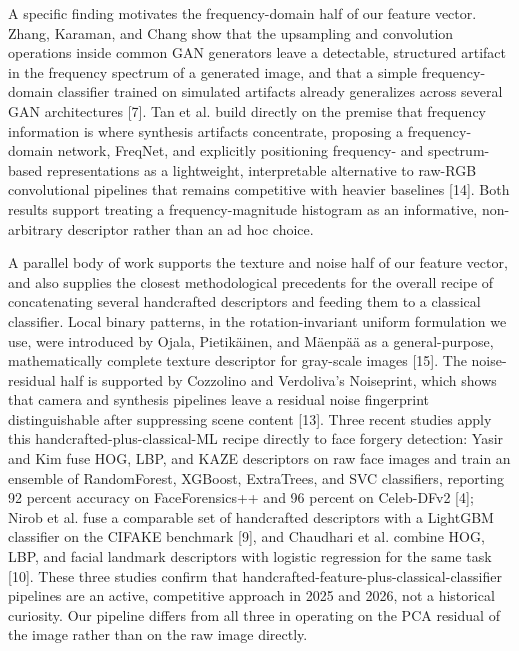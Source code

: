\documentclass[11pt]{article}
\begin{document}
A specific finding motivates the frequency-domain half of our feature vector. Zhang, Karaman, and Chang show that the upsampling and convolution operations inside common GAN generators leave a detectable, structured artifact in the frequency spectrum of a generated image, and that a simple frequency-domain classifier trained on simulated artifacts already generalizes across several GAN architectures [7]. Tan et al. build directly on the premise that frequency information is where synthesis artifacts concentrate, proposing a frequency-domain network, FreqNet, and explicitly positioning frequency- and spectrum-based representations as a lightweight, interpretable alternative to raw-RGB convolutional pipelines that remains competitive with heavier baselines [14]. Both results support treating a frequency-magnitude histogram as an informative, non-arbitrary descriptor rather than an ad hoc choice.

A parallel body of work supports the texture and noise half of our feature vector, and also supplies the closest methodological precedents for the overall recipe of concatenating several handcrafted descriptors and feeding them to a classical classifier. Local binary patterns, in the rotation-invariant uniform formulation we use, were introduced by Ojala, Pietik\"ainen, and M\"aenp\"a\"a as a general-purpose, mathematically complete texture descriptor for gray-scale images [15]. The noise-residual half is supported by Cozzolino and Verdoliva's Noiseprint, which shows that camera and synthesis pipelines leave a residual noise fingerprint distinguishable after suppressing scene content [13]. Three recent studies apply this handcrafted-plus-classical-ML recipe directly to face forgery detection: Yasir and Kim fuse HOG, LBP, and KAZE descriptors on raw face images and train an ensemble of RandomForest, XGBoost, ExtraTrees, and SVC classifiers, reporting 92 percent accuracy on FaceForensics++ and 96 percent on Celeb-DFv2 [4]; Nirob et al. fuse a comparable set of handcrafted descriptors with a LightGBM classifier on the CIFAKE benchmark [9], and Chaudhari et al. combine HOG, LBP, and facial landmark descriptors with logistic regression for the same task [10]. These three studies confirm that handcrafted-feature-plus-classical-classifier pipelines are an active, competitive approach in 2025 and 2026, not a historical curiosity. Our pipeline differs from all three in operating on the PCA residual of the image rather than on the raw image directly.
\end{document}
